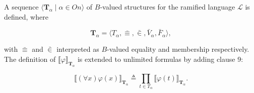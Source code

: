 A sequence $\langle \mathbf{T}_{\alpha} \mid \alpha \in On \rangle$ of $B$-valued structures for the ramified language $\mathcal{L}$ is defined, where

$$
\mathbf{T}_{\alpha} = \langle T_{\alpha}, \bar{\equiv}, \bar{\in}, \bar{V}_{\alpha}, \bar{F}_{\alpha} \rangle,
$$

with $\bar{\equiv}$ and $\bar{\in}$ interpreted as $B$-valued equality and membership respectively. The definition of $\llbracket \varphi \rrbracket_{\mathbf{T}_{\alpha}}$ is extended to unlimited formulas by adding clause 9:

$$
\llbracket (\forall x)\varphi(x) \rrbracket_{\mathbf{T}_{\alpha}} \triangleq \prod_{t \in T_{\alpha}} \llbracket \varphi(t) \rrbracket_{\mathbf{T}_{\alpha}}.
$$
